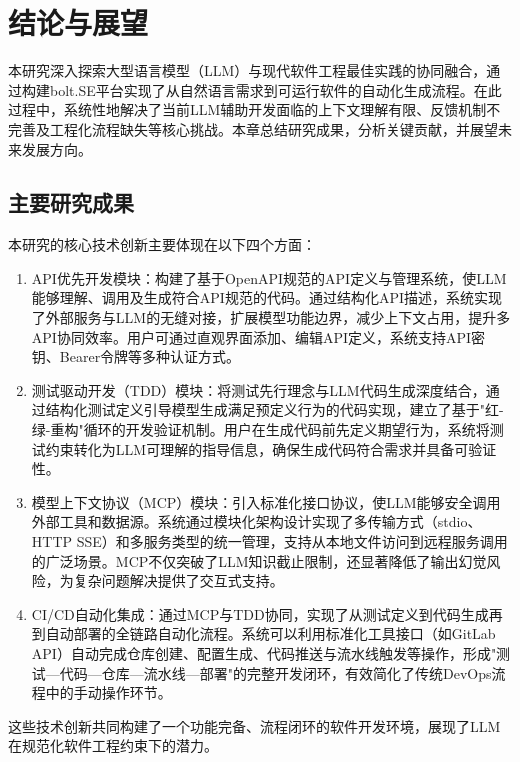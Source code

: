
\chapter{结论与展望}
\label{chap:conclusion}

本研究深入探索大型语言模型（LLM）与现代软件工程最佳实践的协同融合，通过构建bolt.SE平台实现了从自然语言需求到可运行软件的自动化生成流程。在此过程中，系统性地解决了当前LLM辅助开发面临的上下文理解有限、反馈机制不完善及工程化流程缺失等核心挑战。本章总结研究成果，分析关键贡献，并展望未来发展方向。

\section{主要研究成果}

本研究的核心技术创新主要体现在以下四个方面：

\begin{enumerate}
  \item API优先开发模块：构建了基于OpenAPI规范的API定义与管理系统，使LLM能够理解、调用及生成符合API规范的代码。通过结构化API描述，系统实现了外部服务与LLM的无缝对接，扩展模型功能边界，减少上下文占用，提升多API协同效率。用户可通过直观界面添加、编辑API定义，系统支持API密钥、Bearer令牌等多种认证方式。
  
  \item 测试驱动开发（TDD）模块：将测试先行理念与LLM代码生成深度结合，通过结构化测试定义引导模型生成满足预定义行为的代码实现，建立了基于"红-绿-重构"循环的开发验证机制。用户在生成代码前先定义期望行为，系统将测试约束转化为LLM可理解的指导信息，确保生成代码符合需求并具备可验证性。
  
  \item 模型上下文协议（MCP）模块：引入标准化接口协议，使LLM能够安全调用外部工具和数据源。系统通过模块化架构设计实现了多传输方式（stdio、HTTP SSE）和多服务类型的统一管理，支持从本地文件访问到远程服务调用的广泛场景。MCP不仅突破了LLM知识截止限制，还显著降低了输出幻觉风险，为复杂问题解决提供了交互式支持。
  
  \item CI/CD自动化集成：通过MCP与TDD协同，实现了从测试定义到代码生成再到自动部署的全链路自动化流程。系统可以利用标准化工具接口（如GitLab API）自动完成仓库创建、配置生成、代码推送与流水线触发等操作，形成"测试—代码—仓库—流水线—部署"的完整开发闭环，有效简化了传统DevOps流程中的手动操作环节。
\end{enumerate}

这些技术创新共同构建了一个功能完备、流程闭环的软件开发环境，展现了LLM在规范化软件工程约束下的潜力。

